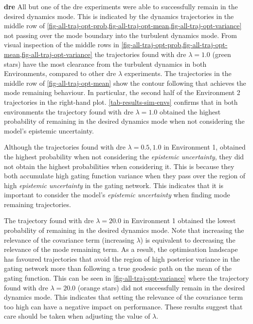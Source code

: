 \documentclass{mimosis-class/mimosis}
\numberwithin{equation}{chapter}
\begin{document}
{\newline
\textbf{\acrfull{dre}}
All but one of the \acrshort{dre} experiments were able to successfully remain in the desired dynamics mode.
This is indicated by the dynamics trajectories in the middle row of
\cref{fig-all-traj-opt-prob,fig-all-traj-opt-mean,fig-all-traj-opt-variance}
not passing over the mode boundary into the turbulent dynamics mode.
From visual inspection of the middle rows in
\cref{fig-all-traj-opt-prob,fig-all-traj-opt-mean,fig-all-traj-opt-variance}
the trajectories found with \acrshort{dre} \(\lambda=1.0\) (green stars) have the most clearance from the turbulent dynamics
in both Environments, compared to other \acrshort{dre} \(\lambda\) experiments.
The trajectories in the middle row of \cref{fig-all-traj-opt-mean}
show the contour following that achieves the mode remaining behaviour.
In particular, the second half of the Environment 2 trajectories in the right-hand plot.
\cref{tab-results-sim-envs} confirms that in both environments the trajectory found with \acrshort{dre} \(\lambda=1.0\) obtained
the highest probability of remaining in the desired dynamics mode when not considering the model's
epistemic uncertainty.


Although the trajectories found with \acrshort{dre} \(\lambda=0.5, 1.0\) in Environment 1,
obtained the highest probability when not considering the \emph{epistemic uncertainty},
they did not obtain the highest probabilities when considering it.
This is because they both accumulate high gating function variance when they pass over the region of high \emph{epistemic
uncertainty} in the gating network.
This indicates that it is important to consider the model's \emph{epistemic uncertainty} when finding
mode remaining trajectories.

The trajectory found with \acrshort{dre} \(\lambda=20.0\) in Environment 1 obtained the lowest probability of
remaining in the desired dynamics mode.
Note that increasing the relevance of the covariance term (increasing \(\lambda\))
is equivalent to decreasing the relevance of the mode remaining term.
As a result, the optimisation landscape has favoured trajectories that
avoid the region of high posterior variance in the gating network more than following a true geodesic path
on the mean of the gating function.
This can be seen in \cref{fig-all-traj-opt-variance} where
the trajectory found with \acrshort{dre} \(\lambda=20.0\) (orange stars)
did not successfully remain in the desired dynamics mode.
This indicates that setting the relevance of the covariance term too high can have a negative impact on performance.
These results suggest that care should be taken when adjusting the value of \(\lambda\).

}
\end{document}
